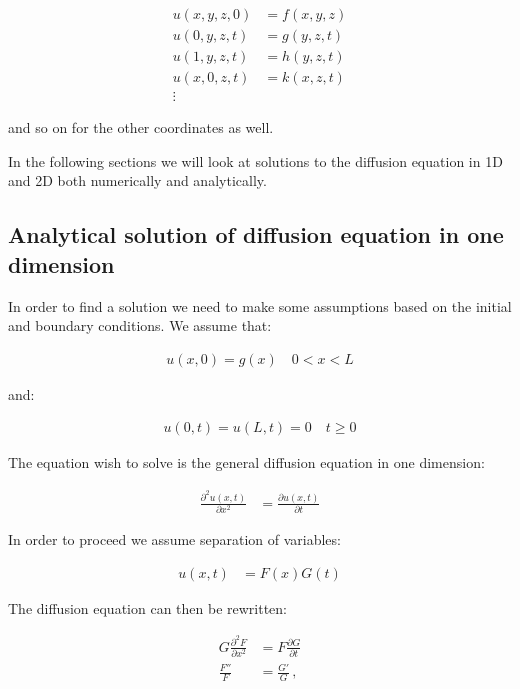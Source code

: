 \documentclass[reprint,english,notitlepage]{revtex4-1}  %
\begin{document}
\begin{align*}
u(x,y,z,0) &= f(x,y,z) \\
u(0,y,z,t) &= g(y,z,t) \\
u(1,y,z,t) &= h(y,z,t) \\
u(x,0,z,t) &= k(x,z,t) \\
\vdots 
\end{align*}

and so on for the other coordinates as well.
 
In the following sections we will look at solutions to the diffusion equation in 1D and 2D both numerically and analytically.




\subsection{Analytical solution of diffusion equation in one dimension} \label{sec:formalism_1D_diff_eq_analytical}

In order to find a solution we need to make some assumptions based on the initial and boundary conditions. We assume that:

\begin{align*}
u(x,0) = g(x) \quad 0 < x < L
\end{align*}

and:

\begin{align*}
u(0,t) = u(L,t) = 0 \quad t \geq 0
\end{align*}

The equation wish to solve is the general diffusion equation in one dimension:

\begin{align*}
\frac{\partial^2 u(x,t)}{\partial x^2} &= \frac{\partial u(x,t)}{\partial t}
\end{align*}

In order to proceed we assume separation of variables:

\begin{align*}
u(x,t) &= F(x)G(t) 
\end{align*}

The diffusion equation can then be rewritten:

\begin{align*}
G \frac{\partial^2 F}{\partial x^2} &= F \frac{\partial G}{\partial t} \\
\frac{F''}{F} &= \frac{G'}{G} \, ,
\end{align*}
\end{document}
